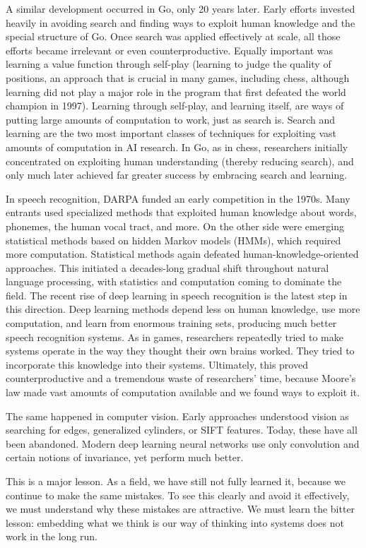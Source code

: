 A similar development occurred in Go, only 20 years later. Early efforts invested heavily in avoiding search and finding ways to exploit human knowledge and the special structure of Go. Once search was applied effectively at scale, all those efforts became irrelevant or even counterproductive. Equally important was learning a value function through self-play (learning to judge the quality of positions, an approach that is crucial in many games, including chess, although learning did not play a major role in the program that first defeated the world champion in 1997). Learning through self-play, and learning itself, are ways of putting large amounts of computation to work, just as search is. Search and learning are the two most important classes of techniques for exploiting vast amounts of computation in AI research. In Go, as in chess, researchers initially concentrated on exploiting human understanding (thereby reducing search), and only much later achieved far greater success by embracing search and learning.

In speech recognition, DARPA funded an early competition in the 1970s. Many entrants used specialized methods that exploited human knowledge about words, phonemes, the human vocal tract, and more. On the other side were emerging statistical methods based on hidden Markov models (HMMs), which required more computation. Statistical methods again defeated human-knowledge-oriented approaches. This initiated a decades-long gradual shift throughout natural language processing, with statistics and computation coming to dominate the field. The recent rise of deep learning in speech recognition is the latest step in this direction. Deep learning methods depend less on human knowledge, use more computation, and learn from enormous training sets, producing much better speech recognition systems. As in games, researchers repeatedly tried to make systems operate in the way they thought their own brains worked. They tried to incorporate this knowledge into their systems. Ultimately, this proved counterproductive and a tremendous waste of researchers' time, because Moore's law made vast amounts of computation available and we found ways to exploit it.

The same happened in computer vision. Early approaches understood vision as searching for edges, generalized cylinders, or SIFT features. Today, these have all been abandoned. Modern deep learning neural networks use only convolution and certain notions of invariance, yet perform much better.

This is a major lesson. As a field, we have still not fully learned it, because we continue to make the same mistakes. To see this clearly and avoid it effectively, we must understand why these mistakes are attractive. We must learn the bitter lesson: embedding what we think is our way of thinking into systems does not work in the long run.

